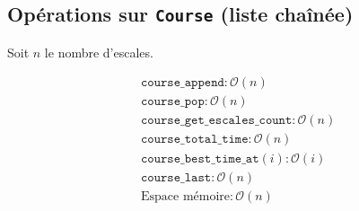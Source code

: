 \subsection{Opérations sur \texttt{Course} (liste chaînée)}

Soit $n$ le nombre d'escales.

\begin{align*}
&\texttt{course\_append} : \mathcal{O}(n) \\
&\texttt{course\_pop} : \mathcal{O}(n) \\
&\texttt{course\_get\_escales\_count} : \mathcal{O}(n) \\
&\texttt{course\_total\_time} : \mathcal{O}(n) \\
&\texttt{course\_best\_time\_at}(i) : \mathcal{O}(i) \\
&\texttt{course\_last} : \mathcal{O}(n) \\
&\text{Espace mémoire} : \mathcal{O}(n)
\end{align*}
